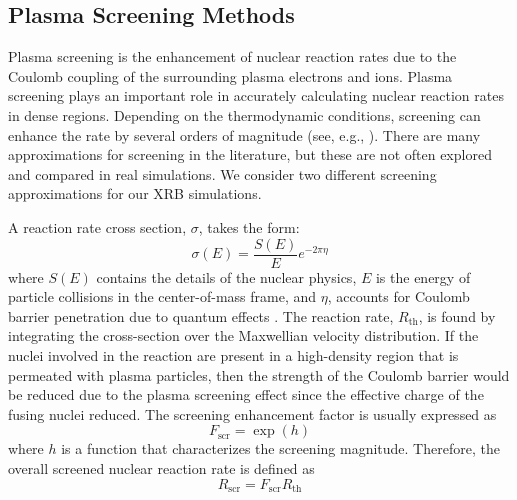 \documentclass[preprint,times,tighten,linenumbers,trackchanges]{aastex631}
\begin{document}


\subsection{Plasma Screening Methods}\label{Sec:screening}

Plasma screening is the enhancement of nuclear reaction rates due to the Coulomb coupling of the surrounding plasma electrons and ions. Plasma screening plays an important role in accurately calculating nuclear reaction rates in dense regions.
Depending on the thermodynamic conditions, 
screening can enhance the rate by several orders
of magnitude (see, e.g., \citealt{woosley-ignition}).
There are many approximations for screening in the literature, but these are not
often explored and compared in real simulations.
We consider two different screening approximations
for our XRB simulations.

A reaction rate cross section, $\sigma$, takes the form:
\begin{equation}
    \sigma(E) = \frac{S(E)}{E} e^{-2\pi \eta}
\end{equation}
where $S(E)$ contains the details of the nuclear physics, $E$ is the energy of particle collisions in the center-of-mass frame, and $\eta$, accounts for Coulomb barrier penetration due to quantum effects \citep{Newton2007}. The reaction rate, $R_{\textrm{th}}$, is found by integrating the cross-section over the Maxwellian velocity distribution.  If the nuclei involved in the reaction are present in a high-density region that is permeated with plasma particles, then the strength of the Coulomb barrier would be reduced due to the plasma screening effect since the effective charge of the fusing nuclei   reduced. The screening enhancement factor is usually expressed as
\begin{equation}
    F_{\textrm{scr}} = \exp{(h)}
\end{equation}
where $h$ is a function that characterizes the screening magnitude. Therefore, the overall screened nuclear reaction rate is defined as
\begin{equation}\label{Eq:screened_rate}
    R_{\textrm{scr}} = F_{\textrm{scr}}R_{\textrm{th}}
\end{equation}
\end{document}

